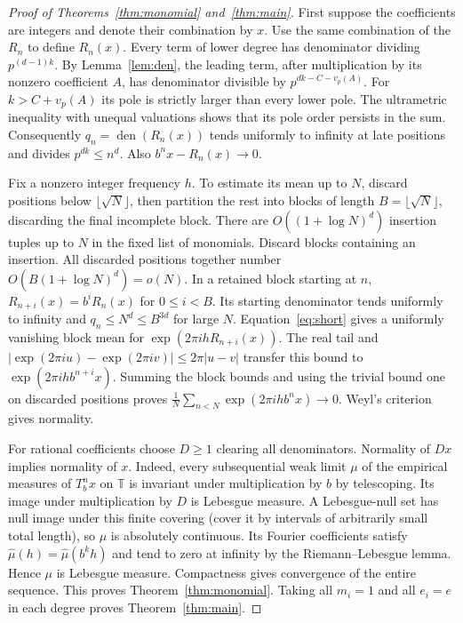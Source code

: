 \documentclass[11pt]{article}
\newcommand{\T}{\mathbb T}
\newcommand{\ee}[1]{\exp(2\pi i #1)}
\DeclareMathOperator{\den}{den}
\begin{document}
\begin{proof}[Proof of Theorems~\ref{thm:monomial} and~\ref{thm:main}]
First suppose the coefficients are integers and denote their combination by $x$.
Use the same combination of the $R_n$ to define $R_n(x)$. Every term of lower degree
has denominator dividing $p^{(d-1)k}$. By Lemma~\ref{lem:den}, the leading term,
after multiplication by its nonzero coefficient $A$, has denominator divisible by
$p^{dk-C-v_p(A)}$. For $k>C+v_p(A)$ its pole is strictly larger than every lower pole.
The ultrametric inequality with unequal valuations shows that its pole order persists
in the sum. Consequently $q_n=\den(R_n(x))$ tends uniformly to infinity at late
positions and divides $p^{dk}\le n^d$. Also $b^nx-R_n(x)\to0$.

Fix a nonzero integer frequency $h$. To estimate its mean up to $N$, discard
positions below $\lfloor\sqrt N\rfloor$, then partition the rest into blocks of length
$B=\lfloor\sqrt N\rfloor$, discarding the final incomplete block.
There are $O((1+\log N)^d)$ insertion tuples up to $N$ in the fixed list of monomials.
Discard blocks containing an insertion. All discarded positions together number
$O(B(1+\log N)^d)=o(N)$. In a retained block starting at $n$,
$R_{n+i}(x)=b^iR_n(x)$ for $0\le i<B$.
Its starting denominator tends uniformly to infinity and $q_n\le N^d\le B^{3d}$
for large $N$. Equation~\eqref{eq:short} gives a uniformly vanishing block mean
for $\ee{h R_{n+i}(x)}$. The real tail and
$|\ee{u}-\ee{v}|\le2\pi |u-v|$ transfer this bound to $\ee{h b^{n+i}x}$.
Summing the block bounds and using the trivial bound one on discarded positions proves
$\frac1N\sum_{n<N}\ee{h b^nx}\to0$. Weyl's criterion \cite{weyl} gives normality.

For rational coefficients choose $D\ge1$ clearing all denominators. Normality
of $Dx$ implies normality of $x$. Indeed, every subsequential weak limit
$\mu$ of the empirical measures of $T_b^nx$ on $\T$ is invariant under multiplication
by $b$ by telescoping. Its image under multiplication by $D$ is Lebesgue measure.
A Lebesgue-null set has null image under this finite covering (cover it by intervals
of arbitrarily small total length), so $\mu$ is absolutely continuous. Its Fourier
coefficients satisfy $\widehat\mu(h)=\widehat\mu(b^k h)$ and tend to zero at infinity
by the Riemann--Lebesgue lemma. Hence $\mu$ is Lebesgue measure. Compactness gives
convergence of the entire sequence. This proves Theorem~\ref{thm:monomial}.
Taking all $m_i=1$ and all $e_i=e$ in each degree proves Theorem~\ref{thm:main}.
\end{proof}
\end{document}
